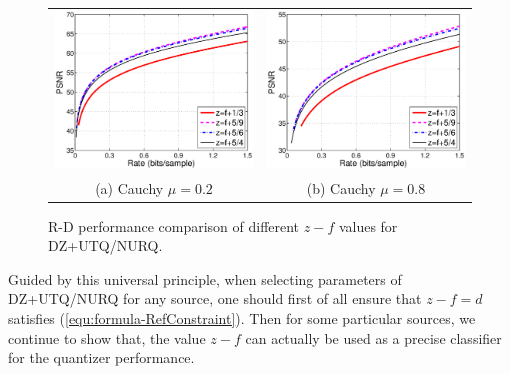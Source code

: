 \documentclass[smallabstract,smallcaptions]{dccpaper}
\begin{document}
\begin{figure}
\begin{center}
\begin{tabular}{cc}
\includegraphics[width = 0.45\linewidth]{Figures/section4/RD_Cauchy_mu=0_2_linear_patterns} &
\includegraphics[width = 0.45\linewidth]{Figures/section4/RD_Cauchy_mu=0_8_linear_patterns} \\
{\small (a) Cauchy $\mu=0.2$} & {\small (b) Cauchy $\mu=0.8$}
\end{tabular}
\end{center}
\vspace{-20pt}
\caption{\label{fig:RD_different_patterns}
R-D performance comparison of different $z-f$ values for DZ+UTQ/NURQ.}
\end{figure}

Guided by this universal principle, when selecting parameters of DZ+UTQ/NURQ for any source, one should first of all ensure that $z-f=d$ satisfies (\ref{equ:formula-RefConstraint}). Then for some particular sources, we continue to show that, the value $z-f$ can actually be used as a precise classifier for the quantizer performance.
\end{document}
